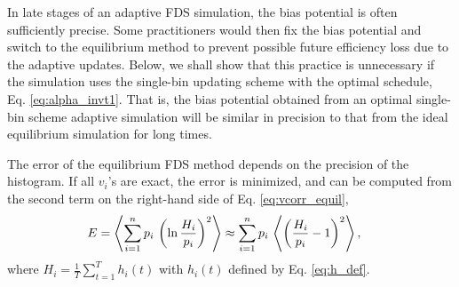 \documentclass[reprint, floatfix]{revtex4-1}
\begin{document}

In late stages of an adaptive FDS simulation,
the bias potential is often sufficiently precise.
Some practitioners would then fix
the bias potential and switch
to the equilibrium method
to prevent possible future efficiency loss
due to the adaptive updates.
%
Below, we shall show that this practice is unnecessary
if the simulation uses the single-bin updating scheme
with the optimal schedule, Eq. \eqref{eq:alpha_invt1}.
%
That is, the bias potential obtained from
an optimal single-bin scheme adaptive simulation
will be similar in precision to that from
the ideal equilibrium simulation
for long times.
%

The error of the equilibrium FDS method
depends on the precision of the histogram.
%
If all $v_i$'s are exact,
the error is minimized, and can be computed
from the second term
on the right-hand side of Eq. \eqref{eq:vcorr_equil},
%
\begin{align}
  E
  &=
  \left\langle
    \sum_{ i = 1 }^ n
      p_i \,
      \left(
        \ln \frac { H_i }
                  { p_i }
      \right)^2
  \right\rangle
  \approx
  \sum_{ i = 1 }^ n
    p_i \,
    \left\langle
      \left(
        \frac { H_i }
              { p_i }
        - 1
      \right)^2
    \right\rangle,
\notag
\end{align}
where
$H_i = \frac{1}{T} \sum_{t = 1}^T h_i(t)$
with
$h_i(t)$ defined by Eq. \eqref{eq:h_def}.
\end{document}
